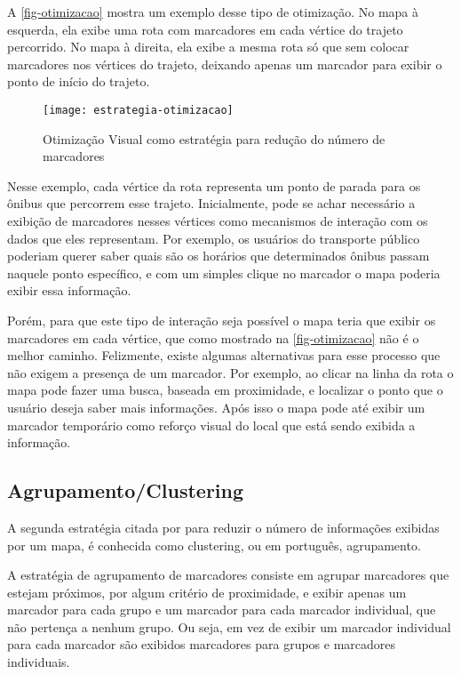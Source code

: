 	A \autoref{fig-otimizacao} mostra um exemplo desse tipo de otimização. No mapa à esquerda, ela exibe uma rota com marcadores em cada vértice do trajeto percorrido. No mapa à direita, ela exibe a mesma rota só que sem colocar marcadores nos vértices do trajeto, deixando apenas um marcador para exibir o ponto de início do trajeto.
	
	 \begin{figure}[htb]
	\caption{\label{fig-otimizacao}Otimização Visual como estratégia para redução do número de marcadores}
	\begin{center}
	    \texttt{[image: estrategia-otimizacao]}
	\end{center}
	\end{figure}
	
	Nesse exemplo, cada vértice da rota representa um ponto de parada para os ônibus que percorrem esse trajeto. Inicialmente, pode se achar necessário a exibição de marcadores nesses vértices como mecanismos de interação com os dados que eles representam. Por exemplo, os usuários do transporte público poderiam querer saber quais são os horários que determinados ônibus passam naquele ponto específico, e com um simples clique no marcador o mapa poderia exibir essa informação. 
	
	Porém, para que este tipo de interação seja possível o mapa teria que exibir os marcadores em cada vértice, que como mostrado na \autoref{fig-otimizacao} não é o melhor caminho. Felizmente, existe algumas alternativas para esse processo que não exigem a presença de um marcador. Por exemplo, ao clicar na linha da rota o mapa pode fazer uma busca, baseada em proximidade, e localizar o ponto que o usuário deseja saber mais informações. Após isso o mapa pode até exibir um marcador temporário como reforço visual do local que está sendo exibida a informação.
	

  \subsection{Agrupamento/Clustering\label{secagrupamento}}
  A segunda estratégia citada por \cite[capítulo~9]{livroGoogleApiV3} para reduzir o número de informações exibidas por um mapa, é conhecida como clustering, ou em português, agrupamento.
  
  A estratégia de agrupamento de marcadores consiste em agrupar marcadores que estejam próximos, por algum critério de proximidade, e exibir apenas um marcador para cada grupo e um marcador para cada marcador individual, que não pertença a nenhum grupo. Ou seja, em vez de exibir um marcador individual para cada marcador são exibidos marcadores para grupos e marcadores individuais. 
  
